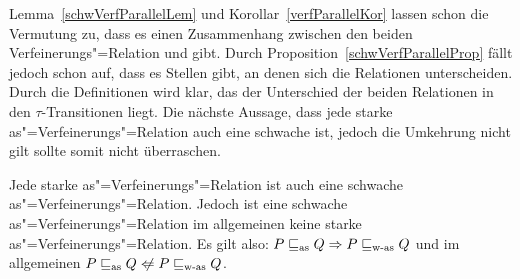 Lemma~\ref{schwVerfParallelLem} und Korollar~\ref{verfParallelKor} lassen schon
die Vermutung zu, dass es einen Zusammenhang zwischen den beiden
Verfeinerungs"=Relation \wasRel{} und \asRel{} gibt. Durch
Proposition~\ref{schwVerfParallelProp} fällt jedoch schon auf, dass es Stellen
gibt, an denen sich die Relationen unterscheiden. Durch die Definitionen wird
klar, das der Unterschied der beiden Relationen in den $\tau$-Transitionen
liegt. Die nächste Aussage, dass jede starke as"=Verfeinerungs"=Relation auch
eine schwache ist, jedoch die Umkehrung nicht gilt sollte somit nicht
überraschen.

\begin{Satz}[Zusammenhang der Verfeinerungs"=Relationen]
  \label{ZusammenhWasAsSatz}
  Jede starke as"=Verfeinerungs"=Relation ist auch eine schwache
  as"=Verfeinerungs"=Relation. Jedoch ist eine schwache
  as"=Verfeinerungs"=Relation im allgemeinen keine starke
  as"=Verfeinerungs"=Relation. Es gilt also: $P \sqsubseteq _{\mathrm{as}} Q \Rightarrow P \sqsubseteq _{\mathrm{w}\text{-}\mathrm{as}}
  Q$ und im allgemeinen $P \asRel Q \hspace{0.1cm}\not\hspace{-0.1cm}\Leftarrow
  P \wasRel Q$.
\end{Satz}

